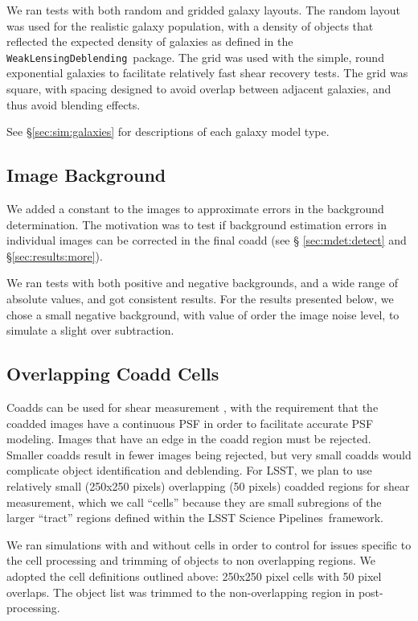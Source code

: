 \documentclass[twocolumn,twocolappendix,astrosym]{openjournal}
\newcommand{\descwl}{\texttt{WeakLensingDeblending}}
\newcommand{\dm}{LSST Science Pipelines}
\begin{document}
We ran tests with both random and gridded galaxy layouts.  The random layout
was used for the realistic galaxy population, with a density of objects that
reflected the expected density of galaxies as defined in the \descwl\ package.
The grid was used with the simple, round exponential galaxies to facilitate
relatively fast shear recovery tests.  The grid was square, with spacing
designed to avoid overlap between adjacent galaxies, and thus avoid blending
effects.

See \S \ref{sec:sim:galaxies} for descriptions of each galaxy model type.

\subsection{Image Background} \label{sec:sim:bgerr}

We added a constant to the images to approximate errors in the background
determination.  The motivation was to test if background estimation errors in
individual images can be corrected in the final coadd (see \S
\ref{sec:mdet:detect} and \S \ref{sec:results:more}).

We ran tests with both positive and negative backgrounds, and a wide range of
absolute values, and got consistent results.  For the results presented below,
we chose a small negative background, with value of order the image noise
level, to simulate a slight over subtraction.

\subsection{Overlapping Coadd Cells} \label{sec:sim:cells}

Coadds can be used for shear measurement \citep{ArmstrongCoadd}, with the
requirement that the coadded images have a continuous PSF in order to
facilitate accurate PSF modeling.  Images that have an edge in the coadd region
must be rejected.  Smaller coadds result in fewer images being rejected, but
very small coadds would complicate object identification and deblending.  For
LSST, we plan to use relatively small (250x250 pixels) overlapping (50 pixels)
coadded regions for shear measurement, which we call ``cells'' because they are
small subregions of the larger ``tract'' regions defined within the \dm\
framework.

We ran simulations with and without cells in order to control for issues
specific to the cell processing and trimming of objects to non overlapping
regions.  We adopted the cell definitions outlined above: 250x250 pixel cells
with 50 pixel overlaps. The object list was trimmed to the non-overlapping
region in post-processing.
\end{document}
